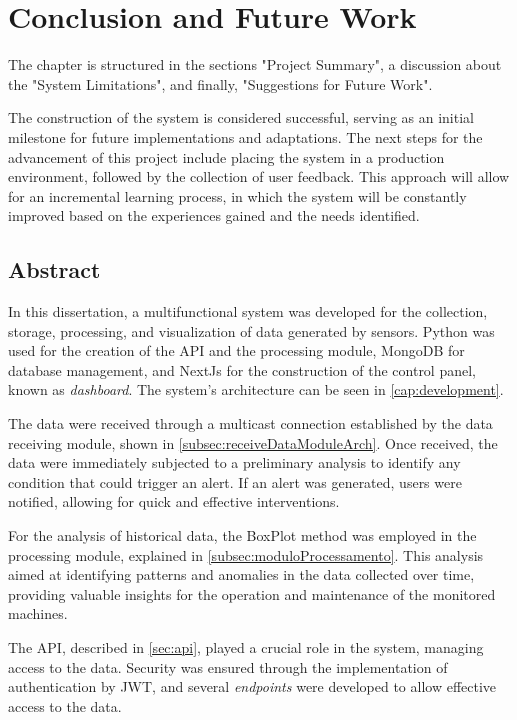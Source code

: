 \chapter{Conclusion and Future Work}\label{chap:conclusion_and_future_work}

The chapter is structured in the sections "Project Summary", a discussion about the "System Limitations", and finally, "Suggestions for Future Work". 

The construction of the system is considered successful, serving as an initial milestone for future implementations and adaptations. The next steps for the advancement of this project include placing the system in a production environment, followed by the collection of user feedback. This approach will allow for an incremental learning process, in which the system will be constantly improved based on the experiences gained and the needs identified.

\section{Abstract}\label{sec:summary}
In this dissertation, a multifunctional system was developed for the collection, storage, processing, and visualization of data generated by sensors. Python was used for the creation of the \gls{API} and the processing module, MongoDB for database management, and NextJs for the construction of the control panel, known as \emph{dashboard}. The system's architecture can be seen in \ref{cap:development}.

The data were received through a multicast connection established by the data receiving module, shown in \ref{subsec:receiveDataModuleArch}. Once received, the data were immediately subjected to a preliminary analysis to identify any condition that could trigger an alert. If an alert was generated, users were notified, allowing for quick and effective interventions.

For the analysis of historical data, the BoxPlot method was employed in the processing module, explained in \ref{subsec:moduloProcessamento}. This analysis aimed at identifying patterns and anomalies in the data collected over time, providing valuable insights for the operation and maintenance of the monitored machines.

The \gls{API}, described in \ref{sec:api}, played a crucial role in the system, managing access to the data. Security was ensured through the implementation of authentication by \gls{JWT}, and several \emph{endpoints} were developed to allow effective access to the data.

